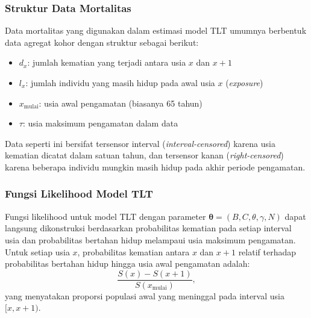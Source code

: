 \subsubsection{Struktur Data Mortalitas}

Data mortalitas yang digunakan dalam estimasi model TLT umumnya berbentuk data agregat kohor dengan struktur sebagai berikut:

\begin{itemize}
    \item $d_x$: jumlah kematian yang terjadi antara usia $x$ dan $x+1$
    \item $l_x$: jumlah individu yang masih hidup pada awal usia $x$ (\textit{exposure})
    \item $x_{\text{mulai}}$: usia awal pengamatan (biasanya 65 tahun)
    \item $\tau$: usia maksimum pengamatan dalam data
\end{itemize}

Data seperti ini bersifat tersensor interval (\textit{interval-censored}) karena usia kematian dicatat dalam satuan tahun, dan tersensor kanan (\textit{right-censored}) karena beberapa individu mungkin masih hidup pada akhir periode pengamatan.

\subsubsection{Fungsi Likelihood Model TLT}

Fungsi likelihood untuk model TLT dengan parameter $\boldsymbol{\theta} = (B, C, \theta, \gamma, N)$ dapat langsung dikonstruksi berdasarkan probabilitas kematian pada setiap interval usia dan probabilitas bertahan hidup melampaui usia maksimum pengamatan. Untuk setiap usia $x$, probabilitas kematian antara $x$ dan $x+1$ relatif terhadap probabilitas bertahan hidup hingga usia awal pengamatan adalah:
\begin{equation}
\frac{S(x) - S(x+1)}{S(x_{\text{mulai}})},
\label{eq:prob_death_relative}
\end{equation}
yang menyatakan proporsi populasi awal yang meninggal pada interval usia $[x, x+1)$.

